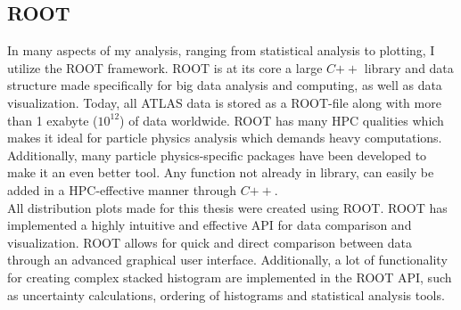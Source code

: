 \subsection{ROOT}
In many aspects of my analysis, ranging from statistical analysis to plotting, I utilize the ROOT framework.
ROOT \cite{ROOT} is at its core a large $C{++}$ library and data structure made specifically for big data
analysis and computing, as well as data visualization. Today, all \ac{ATLAS} data is stored as a ROOT-file along
with more than 1 exabyte ($10^{12}$) of data worldwide. ROOT has many \ac{HPC} qualities which makes it ideal for particle
physics analysis which demands heavy computations. Additionally, many particle physics-specific packages
have been developed to make it an even better tool. Any function not already in library,
can easily be added in a \ac{HPC}-effective manner through $C{++}$.
\\
All distribution plots made for this thesis were created using ROOT. ROOT has implemented a highly intuitive and
effective \ac{API} for data comparison and visualization. ROOT allows for quick and direct 
comparison between data through an advanced graphical user interface. Additionally, a lot of
functionality for creating complex stacked histogram are implemented in the ROOT \ac{API}, such
as uncertainty calculations, ordering of histograms and statistical analysis tools. 
